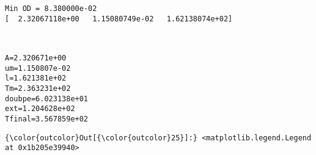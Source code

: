 \documentclass[11pt]{article}
\begin{document}
    \begin{Verbatim}[commandchars=\\\{\}]
Min OD = 8.380000e-02
[  2.32067118e+00   1.15080749e-02   1.62138074e+02]

    \end{Verbatim}

    \begin{center}
    \end{center}
    { \hspace*{\fill} \\}
    
    \begin{Verbatim}[commandchars=\\\{\}]
A=2.320671e+00
um=1.150807e-02
l=1.621381e+02
Tm=2.363231e+02
doubpe=6.023138e+01
ext=1.204628e+02
Tfinal=3.567859e+02

    \end{Verbatim}

            \begin{Verbatim}[commandchars=\\\{\}]
{\color{outcolor}Out[{\color{outcolor}25}]:} <matplotlib.legend.Legend at 0x1b205e39940>
\end{Verbatim}
        
    \begin{center}
    \end{center}
    { \hspace*{\fill} \\}
    
    \begin{center}
    \end{center}
    { \hspace*{\fill} \\}
    
\end{document}
